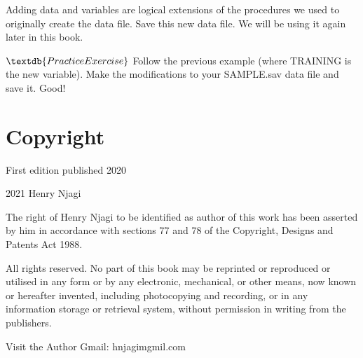 \documentclass[
]{book}
\begin{document}
Adding data and variables are logical extensions of the procedures we used to originally create the data file. Save this new data file. We will be using it again later in this book.

\(\textdb{Practice Exercise}\)
Follow the previous example (where TRAINING is the new variable). Make the modifications to your SAMPLE.sav data file and save it. Good!

\hypertarget{copyright}{%
\chapter{Copyright}\label{copyright}}

First edition published 2020

2021 Henry Njagi

The right of Henry Njagi to be identified as author of this work has been asserted by him in accordance with sections 77 and 78 of the Copyright, Designs and Patents Act 1988.

All rights reserved. No part of this book may be reprinted or reproduced or utilised in any form or by any electronic, mechanical, or other means, now known or hereafter invented, including photocopying and recording, or in any information storage or retrieval system, without permission in writing from the publishers.

Visit the Author Gmail: hnjagimgmil.com

  
\end{document}
